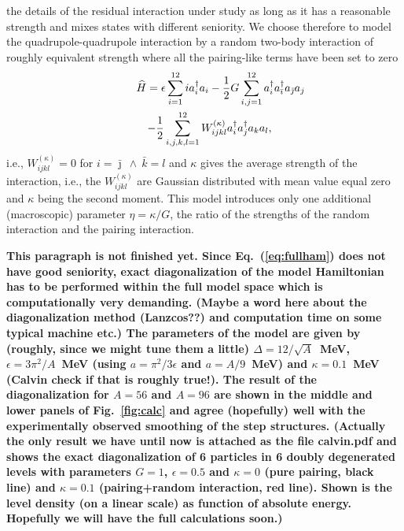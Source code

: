 \begin{multicols}{2}
the details of the residual interaction under study as long as it has a 
reasonable strength and mixes states with different seniority. We choose 
therefore to model the quadrupole-quadrupole interaction by a random two-body
interaction of roughly equivalent strength where all the pairing-like terms 
have been set to zero \cite{MF75}
\begin{eqnarray}
\lefteqn{\widehat{H}=\epsilon\sum_{i=1}^{12}ia_i^\dagger a_i-\frac{1}{2}G
\sum_{i,j=1}^{12}a_i^\dagger a_{\bar{\imath}}^\dagger a_{\bar{\jmath}}a_j}
\nonumber\\
&&-\frac{1}{2}\sum_{i,j,k,l=1}^{12}W_{ijkl}^{(\kappa)}a_i^\dagger a_j^\dagger 
a_ka_l,
\label{eq:fullham}
\end{eqnarray}
i.e., $W_{ijkl}^{(\kappa)}=0$ for $i=\bar{\jmath}\ \wedge\ \bar{k}=l$ and 
$\kappa$ gives the average strength of the interaction, i.e., the 
$W_{ijkl}^{(\kappa)}$ are Gaussian distributed with mean value equal zero and 
$\kappa$ being the second moment. This model introduces only one additional 
(macroscopic) parameter $\eta=\kappa/G$, the ratio of the strengths of the 
random interaction and the pairing interaction.

\bf This paragraph is not finished yet. \rm 
Since Eq.\ (\ref{eq:fullham}) does not have good seniority, exact 
diagonalization of the model Hamiltonian has to be performed within the full 
model space which is computationally very demanding. (Maybe a word here about
the diagonalization method (Lanzcos??) and computation time on some typical
machine etc.) The parameters of the model are given by (roughly, since we might
tune them a little) $\Delta=12/\sqrt{A}$~MeV, $\epsilon=3\pi^2/A$~MeV (using
$a=\pi^2/3\epsilon$ and $a=A/9$~MeV) and $\kappa=0.1$~MeV (Calvin check if that
is roughly true!). The result of the diagonalization for $A=56$ and $A=96$ are 
shown in the middle and lower panels of Fig.\ \ref{fig:calc} and agree 
(hopefully) well with the experimentally observed smoothing of the step 
structures. (Actually the only result we have until now is attached as the file
calvin.pdf and shows the exact diagonalization of 6 particles in 6 doubly 
degenerated levels with parameters $G=1$, $\epsilon=0.5$ and $\kappa=0$ (pure 
pairing, black line) and $\kappa=0.1$ (pairing+random interaction, red line).
Shown is the level density (on a linear scale) as function of absolute energy. 
Hopefully we will have the full calculations soon.)


\end{multicols}
